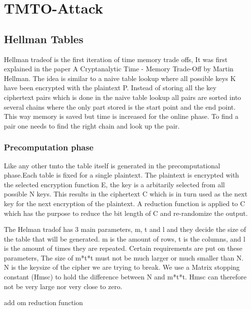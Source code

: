 \chapter{TMTO-Attack}

\label{ch:tmto}

\newpage
\section{Hellman Tables}
Hellman tradeof is the first iteration of time memory trade offs, It was first explained in the paper A Cryptanalytic Time - Memory Trade-Off by Martin Hellman.
The idea is similar to a naive table lookup where all possible keys K have been encrypted with the plaintext P. Instead of storing all the key ciphertext pairs which is done in the naive table lookup all pairs are sorted into several chains where the only part stored is the start point and the end point. This way memory is saved but time is increased for the online phase. To find a pair one needs to find the right chain and look up the pair.


\subsection*{Precomputation phase}
Like any other tmto the table itself is generated in the precomputational phase.Each table is fixed for a single plaintext. The plaintext is encrypted with the selected encryption function E, the key is a arbitarily selected from all possible N keys. This results in the ciphertext C which is in turn used as the next key for the next encryption of the plaintext. A reduction function is applied to C which has the purpose to reduce the bit length of C and re-randomize the output.

The Helman tradof has 3 main parameters, m, t and l and they decide the size of the table that will be generated.
m is the amount of rows, t is the columns, and l is the amount of times they are repeated.
Certain requirements are put on these parameters, The size of m*t*t must not be much larger or much smaller than N.
N is the keysize of the cipher we are trying to break. We use a Matrix stopping constant (Hmsc) to hold the difference between N and m*t*t. Hmsc can therefore not be very large nor very close to zero.

add om reduction function

